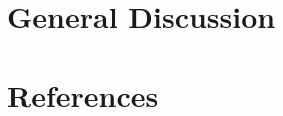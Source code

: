 \documentclass[12pt, twoside]{report}
\begin{document}
%

\chapter{General Discussion}


\appendix
\fancyhead{}
\fancyhead[RO,LE]{\nouppercase{\leftmark}}
\fancyfoot{}
\fancyfoot[LE,RO]{\thepage}


\chapter{References}


\end{document}
